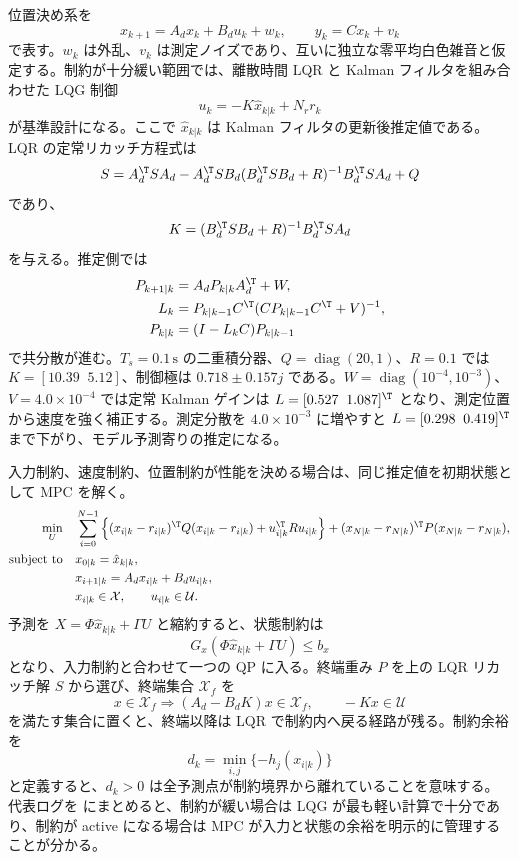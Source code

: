 位置決め系を
\begin{equation}
  x_{k+1}=A_dx_k+B_du_k+w_k,
  \qquad
  y_k=Cx_k+v_k
\end{equation}
で表す。$w_k$ は外乱、$v_k$ は測定ノイズであり、互いに独立な零平均白色雑音と仮定する。制約が十分緩い範囲では、離散時間 LQR と Kalman フィルタを組み合わせた LQG 制御
\begin{equation}
  u_k=-K\hat{x}_{k|k}+N_rr_k
\end{equation}
が基準設計になる。ここで $\hat{x}_{k|k}$ は Kalman フィルタの更新後推定値である。LQR の定常リカッチ方程式は
\begin{equation}
  S=A_d^\T SA_d
  -A_d^\T SB_d(B_d^\T SB_d+R)^{-1}B_d^\T SA_d
  +Q
\end{equation}
であり、
\begin{equation}
  K=(B_d^\T SB_d+R)^{-1}B_d^\T SA_d
\end{equation}
を与える。推定側では
\begin{align}
  P_{k+1|k}&=A_dP_{k|k}A_d^\T+W,\\
  L_k&=P_{k|k-1}C^\T(CP_{k|k-1}C^\T+V)^{-1},\\
  P_{k|k}&=(I-L_kC)P_{k|k-1}
\end{align}
で共分散が進む。$T_s=0.1\,\mathrm{s}$ の二重積分器、$Q=\operatorname{diag}(20,1)$、$R=0.1$ では $K=[10.39\;\;5.12]$、制御極は $0.718\pm0.157j$ である。$W=\operatorname{diag}(10^{-4},10^{-3})$、$V=4.0\times10^{-4}$ では定常 Kalman ゲインは $L=[0.527\;\;1.087]^\T$ となり、測定位置から速度を強く補正する。測定分散を $4.0\times10^{-3}$ に増やすと $L=[0.298\;\;0.419]^\T$ まで下がり、モデル予測寄りの推定になる。

入力制約、速度制約、位置制約が性能を決める場合は、同じ推定値を初期状態として MPC を解く。
\begin{align}
  \min_{U}\quad&
  \sum_{i=0}^{N-1}
  \left\{
    (x_{i|k}-r_{i|k})^\T Q(x_{i|k}-r_{i|k})
    +u_{i|k}^\T Ru_{i|k}
  \right\}
  +(x_{N|k}-r_{N|k})^\T P(x_{N|k}-r_{N|k}),\\
  \text{subject to}\quad&
  x_{0|k}=\hat{x}_{k|k},\\
  &x_{i+1|k}=A_dx_{i|k}+B_du_{i|k},\\
  &x_{i|k}\in\mathcal{X},\qquad u_{i|k}\in\mathcal{U}.
\end{align}
予測を $X=\Phi\hat{x}_{k|k}+\Gamma U$ と縮約すると、状態制約は
\begin{equation}
  G_x(\Phi\hat{x}_{k|k}+\Gamma U)\le b_x
\end{equation}
となり、入力制約と合わせて一つの QP に入る。終端重み $P$ を上の LQR リカッチ解 $S$ から選び、終端集合 $\mathcal{X}_f$ を
\begin{equation}
  x\in\mathcal{X}_f
  \Rightarrow
  (A_d-B_dK)x\in\mathcal{X}_f,\qquad -Kx\in\mathcal{U}
\end{equation}
を満たす集合に置くと、終端以降は LQR で制約内へ戻る経路が残る。制約余裕を
\begin{equation}
  d_k=\min_{i,j}\{-h_j(x_{i|k})\}
\end{equation}
と定義すると、$d_k>0$ は全予測点が制約境界から離れていることを意味する。代表ログを  にまとめると、制約が緩い場合は LQG が最も軽い計算で十分であり、制約が active になる場合は MPC が入力と状態の余裕を明示的に管理することが分かる。

